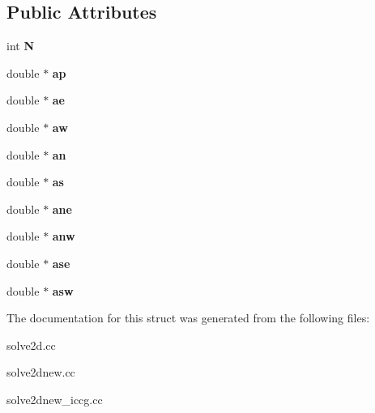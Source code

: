 \subsection*{Public Attributes}
\begin{DoxyCompactItemize}
\item 
\hypertarget{struct_diag_matrix_a542779c774abd29f1fbcbe4502fec68c}{}int {\bfseries N}\label{struct_diag_matrix_a542779c774abd29f1fbcbe4502fec68c}

\item 
\hypertarget{struct_diag_matrix_ab6667e3658ffb218a514921bd6edf836}{}double $\ast$ {\bfseries ap}\label{struct_diag_matrix_ab6667e3658ffb218a514921bd6edf836}

\item 
\hypertarget{struct_diag_matrix_a299ea244a8dd5adae4d33273200bff04}{}double $\ast$ {\bfseries ae}\label{struct_diag_matrix_a299ea244a8dd5adae4d33273200bff04}

\item 
\hypertarget{struct_diag_matrix_a0b8063600cb0a5ae68205bafec8e6c39}{}double $\ast$ {\bfseries aw}\label{struct_diag_matrix_a0b8063600cb0a5ae68205bafec8e6c39}

\item 
\hypertarget{struct_diag_matrix_a36c4e713151d93e823ccf0f9b6b2e677}{}double $\ast$ {\bfseries an}\label{struct_diag_matrix_a36c4e713151d93e823ccf0f9b6b2e677}

\item 
\hypertarget{struct_diag_matrix_a8f63797b1593002f9d4ab22cb2f7d5be}{}double $\ast$ {\bfseries as}\label{struct_diag_matrix_a8f63797b1593002f9d4ab22cb2f7d5be}

\item 
\hypertarget{struct_diag_matrix_a4b6010d03b0cc9cc0b0e417bf22cbfb0}{}double $\ast$ {\bfseries ane}\label{struct_diag_matrix_a4b6010d03b0cc9cc0b0e417bf22cbfb0}

\item 
\hypertarget{struct_diag_matrix_aab638df523cf63b74511a2969e82c6dc}{}double $\ast$ {\bfseries anw}\label{struct_diag_matrix_aab638df523cf63b74511a2969e82c6dc}

\item 
\hypertarget{struct_diag_matrix_a849a43aab25e21d35f55cd1c466ffbb0}{}double $\ast$ {\bfseries ase}\label{struct_diag_matrix_a849a43aab25e21d35f55cd1c466ffbb0}

\item 
\hypertarget{struct_diag_matrix_a0017cc72ae5cf2b307f6bc5a101d19f2}{}double $\ast$ {\bfseries asw}\label{struct_diag_matrix_a0017cc72ae5cf2b307f6bc5a101d19f2}

\end{DoxyCompactItemize}


The documentation for this struct was generated from the following files\+:\begin{DoxyCompactItemize}
\item 
solve2d.\+cc\item 
solve2dnew.\+cc\item 
solve2dnew\+\_\+iccg.\+cc\end{DoxyCompactItemize}
